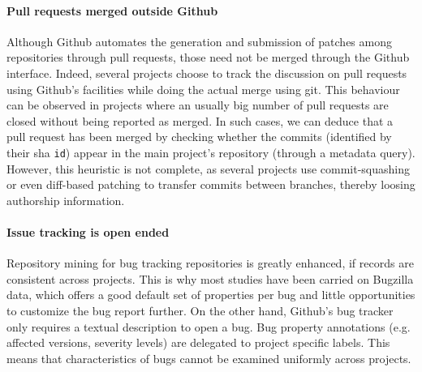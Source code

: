 \documentclass[conference]{IEEEtran}
\begin{document}
\paragraph*{Pull requests merged outside Github} Although Github
    automates the generation and submission of patches among repositories
    through pull requests, those need not be merged through the Github
    interface. Indeed, several projects choose to track the discussion on pull
    requests using Github's facilities while doing the actual merge using
    {\sf git}. This behaviour can be observed in projects where an usually big
    number of pull requests are closed without being reported as merged.
    In such cases, we can deduce that a pull request has been merged by checking
    whether the commits (identified by their {\sc sha} \texttt{id}) appear in 
    the main project's repository (through a metadata query). However, this
    heuristic is not complete, as several projects use commit-squashing or
    even diff-based patching to transfer commits between branches, thereby
    loosing authorship information.


\paragraph*{Issue tracking is open ended} Repository mining for bug tracking
    repositories is greatly enhanced, if records are consistent across
    projects. This is why most studies have been carried on Bugzilla data, which
    offers a good default set of properties per bug and little opportunities to
    customize the bug report further. On the other hand, Github's bug tracker
    only requires a textual description to open a bug. Bug property annotations
    (e.g. affected versions, severity levels) are delegated to project specific
    labels. This means that characteristics of bugs cannot be
    examined uniformly across projects.
\end{document}
